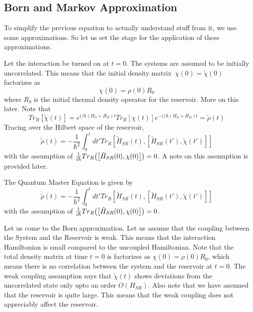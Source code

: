 \documentclass{scrartcl}
\newcommand{\1}{\mathbbm{1}}
\begin{document}
\subsection{Born and Markov Approximation}
To simplify the previous equation to actually understand stuff from it, we use some approximations. So let us set the stage 
for the application of these approximations.

Let the interaction be turned on at $t=0$. The systems are assumed to be initially uncorrelated. This means that the initial density matrix\
$\chi(0) = \tilde{\chi}(0)$ factorizes as 
\begin{equation}
    \chi(0) = \rho(0) R_0
\end{equation}
where $R_0$ is the initial thermal density operator for the reservoir. More on this later. Note that 
\begin{equation*}
    Tr_R[\tilde{\chi}(t)] = e^{i\slash \hbar (H_S + H_R)t} Tr_R[\chi (t)] e^{-i\slash \hbar (H_S + H_R)t} = \tilde{\rho}(t)
\end{equation*}
Tracing over the Hilbert space of the reservoir, 
\begin{equation*}
    \dot{\tilde{\rho}}(t) = -\frac{1}{\hbar^2} \int_0^t dt' Tr_R[\tilde{H}_{SR}(t), [\tilde{H}_{SR}(t'), \tilde{\chi}(t')]]
\end{equation*}
with the assumption of $\frac{1}{i\hbar} Tr_R\qty(\qty[\tilde{H}_{SR}(0),\chi (0)]) = 0$. A note on this 
assumption is provided later.
\begin{definition}
    The Quantum Master Equation is given by 
    \begin{equation}
        \dot{\tilde{\rho}}(t) = -\frac{1}{\hbar^2} \int_0^t dt' Tr_R[\tilde{H}_{SR}(t), [\tilde{H}_{SR}(t'), \tilde{\chi}(t')]]
    \end{equation}
    with the assumption of $\frac{1}{i\hbar} Tr_R\qty(\qty[\tilde{H}_{SR}(0),\chi (0)]) = 0$.
\end{definition}
Let us come to the Born approximation. Let us assume that the coupling between the System and the Reservoir is weak. 
This means that the interaction Hamiltonian is small compared to the uncoupled Hamiltonian. Note that the total 
density matrix at time $t=0$ is factorizes as $\chi(0) = \rho(0) R_0$, which means there is no correlation 
between the system and the reservoir at $t=0$. The weak coupling assumption says that $\tilde{\chi}(t)$
shows deviations from the uncorrelated state only upto an order $O(H_{SR})$. Also note that we have assumed that the 
reservoir is quite large. This means that the weak coupling does not appreciably affect the reservoir. 
\end{document}
